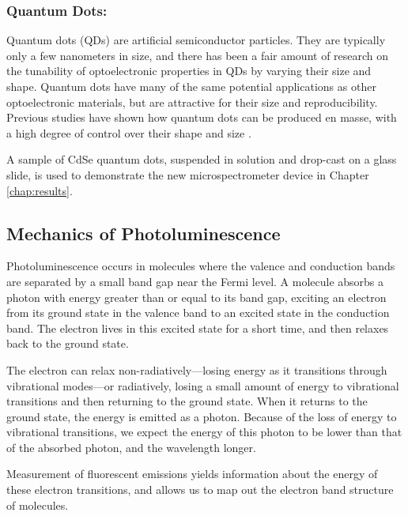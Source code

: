\subsubsection{Quantum Dots: }

Quantum dots (QDs) are artificial semiconductor particles. They are typically only a few nanometers in size, and there has been a fair amount of research on the tunability of optoelectronic properties in QDs by varying their size and shape. Quantum dots have many of the same potential applications as other optoelectronic materials, but are attractive for their size and reproducibility. Previous studies have shown how quantum dots can be produced en masse, with a high degree of control over their shape and size \cite{empedocles_photoluminescence_1996, murray_synthesis_2000}.

A sample of CdSe quantum dots, suspended in solution and drop-cast on a glass slide, is used to demonstrate the new microspectrometer device in Chapter \ref{chap:results}.

\subsection{Mechanics of Photoluminescence}
Photoluminescence occurs in molecules where the valence and conduction bands are separated by a small band gap near the Fermi level. A molecule absorbs a photon with energy greater than or equal to its band gap, exciting an electron from its ground state in the valence band to an excited state in the conduction band. The electron lives in this excited state for a short time, and then relaxes back to the ground state.

The electron can relax non-radiatively---losing energy as it transitions through vibrational modes---or radiatively, losing a small amount of energy to vibrational transitions and then returning to the ground state. When it returns to the ground state, the energy is emitted as a photon. Because of the loss of energy to vibrational transitions, we expect the energy of this photon to be lower than that of the absorbed photon, and the wavelength longer.

Measurement of fluorescent emissions yields information about the energy of these electron transitions, and allows us to map out the electron band structure of molecules.
